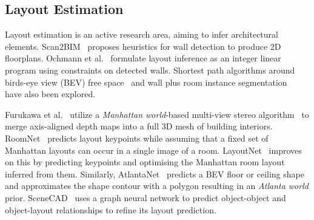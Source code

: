 \begin{table*}[t]
\label{table:commands_and_parameters}
\end{table*}




\subsection{Layout Estimation}
Layout estimation is an active research area, aiming to infer architectural elements. Scan2BIM~\cite{murali2017indoor} proposes heuristics for wall detection to produce 2D floorplans.
Ochmann et al.~\cite{ochmann2019automatic} formulate layout inference as an integer linear program using constraints on detected walls. 
Shortest path algorithms around birds-eye view (BEV) free space~\cite{cabral2014piecewise} and wall plus room instance segmentation~\cite{chen2019floor} have also been explored.


Furukawa et al.~\cite{furukawa2009reconstructing} utilize a \textit{Manhattan world}-based multi-view stereo algorithm~\cite{furukawa2009manhattan} to merge axis-aligned depth maps into a full 3D mesh of building interiors.
RoomNet~\cite{lee2017roomnet} predicts layout keypoints while assuming that a fixed set of Manhattan layouts can occur in a single image of a room. 
LayoutNet~\cite{zou2018layoutnet} improves on this by predicting keypoints and optimising the Manhattan room layout inferred from them.
Similarly, AtlantaNet~\cite{pintore2020atlantanet} predicts a BEV floor or ceiling shape and approximates the shape contour with a polygon resulting in an \textit{Atlanta world} prior. 
SceneCAD~\cite{avetisyan2020scenecad} uses a graph neural network to predict object-object and object-layout relationships to refine its layout prediction.


